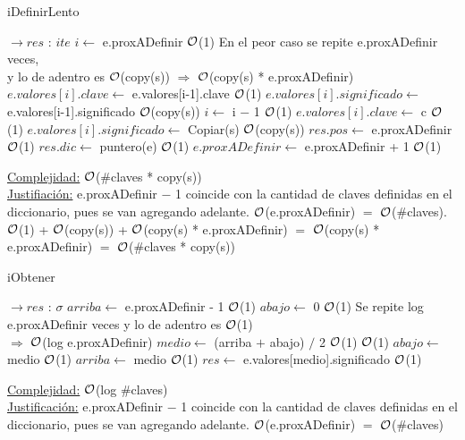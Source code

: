 \begin{Representacion}
	\begin{algorithm}[H]
		\caption{iDefinirLento}
		\begin{algorithmic}
			 $\to res$ : $ite$
				\State $i \gets$ e.proxADefinir \Comment $\mathcal{O}$(1)
				 \Comment En el peor caso se repite e.proxADefinir veces,\\
				 \hfill y lo de adentro es $\mathcal{O}$(copy(s)) $\Rightarrow$ $\mathcal{O}$(copy(s) * e.proxADefinir)	
					\State $e.valores[i].clave \gets$ e.valores[i-1].clave \Comment $\mathcal{O}$(1)
					\State $e.valores[i].significado \gets$ e.valores[i-1].significado \Comment $\mathcal{O}$(copy(s))
					\State $i \gets$ i $-$ 1 \Comment $\mathcal{O}$(1)
				\EndWhile
				\State $e.valores[i].clave \gets$ c \Comment $\mathcal{O}$(1)
				\State $e.valores[i].significado \gets$ Copiar(s) \Comment $\mathcal{O}$(copy(s))
				\State $res.pos \gets$ e.proxADefinir \Comment $\mathcal{O}$(1)
				\State $res.dic \gets$ puntero(e) \Comment $\mathcal{O}$(1)
				\State $e.proxADefinir \gets$ e.proxADefinir + 1 \Comment $\mathcal{O}$(1)
			\EndProcedure
		\end{algorithmic}
		\underline{Complejidad:} $\mathcal{O}$($\#$claves * copy(s))\\
		\underline{Justifiación:} e.proxADefinir $-$ 1 coincide con la cantidad de claves definidas en el diccionario, pues se van agregando adelante. $\mathcal{O}$(e.proxADefinir) $=$ $\mathcal{O}$($\#$claves). $\mathcal{O}$(1) + $\mathcal{O}$(copy(s)) + $\mathcal{O}$(copy(s) * e.proxADefinir) $=$ $\mathcal{O}$(copy(s) * e.proxADefinir) $=$ $\mathcal{O}$($\#$claves * copy(s))
	\end{algorithm}	
	
	
	\begin{algorithm}[H]
		\caption{iObtener}
		\begin{algorithmic}
			 $\to res$ : $\sigma$
				\State $arriba \gets$ e.proxADefinir - 1 \Comment $\mathcal{O}$(1)
				\State $abajo \gets$ 0 \Comment $\mathcal{O}$(1)
				 \Comment Se repite log e.proxADefinir veces y lo de adentro es $\mathcal{O}$(1)\\
				 \hfill $\Rightarrow$ $\mathcal{O}$(log e.proxADefinir)
					\State $	medio \gets$ (arriba $+$ abajo) $/$ 2 \Comment $\mathcal{O}$(1)
					 \Comment $\mathcal{O}$(1)
						\State $abajo \gets$ medio \Comment $\mathcal{O}$(1)
					\Else
						\State $arriba \gets$ medio \Comment $\mathcal{O}$(1)
					\EndIf
				\EndWhile
				\State $res \gets$ e.valores[medio].significado \Comment $\mathcal{O}$(1)
			\EndProcedure
		\end{algorithmic}
		\underline{Complejidad:} $\mathcal{O}$(log $\#$claves)\\
		\underline{Justificación:} e.proxADefinir $-$ 1 coincide con la cantidad de claves definidas en el diccionario, pues se van agregando adelante. $\mathcal{O}$(e.proxADefinir) $=$ $\mathcal{O}$($\#$claves)
	\end{algorithm}
	
\end{Representacion}